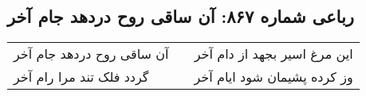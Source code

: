 \begin{center}
\section*{رباعی شماره ۸۶۷: آن ساقی روح دردهد جام آخر}
\label{sec:0867}
\begin{longtable}{l p{0.5cm} r}
آن ساقی روح دردهد جام آخر
&&
این مرغ اسیر بجهد از دام آخر
\\
گردد فلک تند مرا رام آخر
&&
وز کرده پشیمان شود ایام آخر
\\
\end{longtable}
\end{center}

